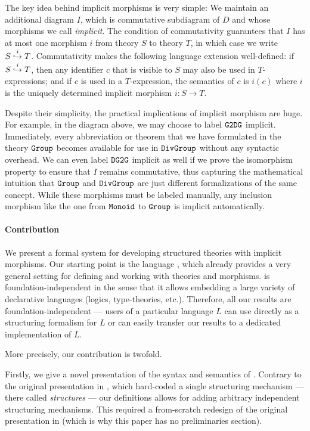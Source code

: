 The key idea behind implicit morphisms is very simple:
We maintain an additional diagram $I$, which is commutative subdiagram of $D$ and whose morphisms we call \emph{implicit}.
The condition of commutativity guarantees that $I$ has at most one morphism $i$ from theory $S$ to theory $T$, in which case we write $\ipc{i}{S}{T}$.
Commutativity makes the following language extension well-defined: if $\ipc{i}{S}{T}$, then any identifier $c$ that is visible to $S$ may also be used in $T$-expressions; and if $c$ is used in a $T$-expression, the semantics of $c$ is $i(c)$ where $i$ is the uniquely determined implicit morphism $i:S\to T$.

Despite their simplicity, the practical implications of implicit morphism are huge.
For example, in the diagram above, we may choose to label $\cn{G2DG}$ implicit.
Immediately, every abbreviation or theorem that we have formulated in the theory $\cn{Group}$ becomes available for use in $\cn{DivGroup}$ without any syntactic overhead.
We can even label $\cn{DG2G}$ implicit as well if we prove the isomorphism property to ensure that $I$ remains commutative, thus capturing the mathematical intuition that $\cn{Group}$ and $\cn{DivGroup}$ are just different formalizations of the same concept.
While these morphisms must be labeled manually, any inclusion morphism like the one from $\cn{Monoid}$ to $\cn{Group}$ is implicit automatically.

\paragraph{Contribution}
We present a formal system for developing structured theories with implicit morphisms.
Our starting point is the \mmt language \cite{RK:mmt:10}, which already provides a very general setting for defining and working with theories and morphisms.
\mmt is foundation-independent in the sense that it allows embedding a large variety of declarative languages (logics, type-theories, etc.).
Therefore, all our results are foundation-independent --- users of a particular language $L$ can use \mmt directly as a structuring formalism for $L$ or can easily transfer our results to a dedicated implementation of $L$.

More precisely, our contribution is twofold.
\medskip

Firstly, we give a novel presentation of the syntax and semantics of \mmt.
Contrary to the original presentation in \cite{RK:mmt:10}, which hard-coded a single structuring mechanism --- there called \textit{structures} --- our definitions allows for adding arbitrary independent structuring mechanisms.
This required a from-scratch redesign of the original presentation in \cite{RK:mmt:10} (which is why this paper has no preliminaries section).

